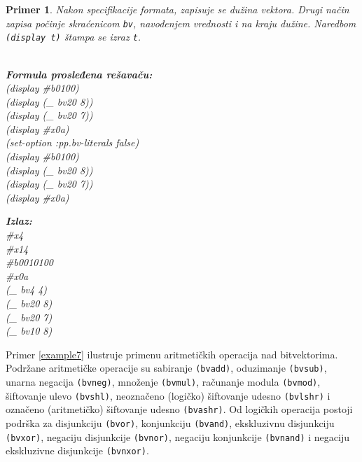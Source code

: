 \documentclass[12pt,oneside]{memoir}
\newtheorem{primer}{Primer}
\begin{document}
\begin{primer} \label{example6} 
Nakon specifikacije formata, zapisuje se dužina vektora. Drugi način zapisa počinje skraćenicom \texttt{bv}, navođenjem vrednosti i na kraju dužine. Naredbom \texttt{(display t)} štampa se izraz \texttt{t}.\\\\
\begin{minipage}[b]{0.45\textwidth}
\textbf{Formula prosleđena rešavaču:}
\\(display \#b0100)
\\(display (\_ bv20 8))
\\(display (\_ bv20 7))
\\(display \#x0a) 
\\(set-option :pp.bv-literals false)
\\(display \#b0100)
\\(display (\_ bv20 8))
\\(display (\_ bv20 7))
\\(display \#x0a)
\end{minipage}
\hspace{2.5cm}
\begin{minipage}[t]{0.4\textwidth}
\vspace{-5.93cm}
\textbf{Izlaz:}
\\\#x4 
\\\#x14 
\\\#b0010100 
\\\#x0a 
\\(\_ bv4 4) 
\\(\_ bv20 8) 
\\(\_ bv20 7) 
\\(\_ bv10 8)
\end{minipage}
\end{primer}
\par Primer \ref{example7} ilustruje primenu aritmetičkih operacija nad bitvektorima. Podržane aritmetičke operacije su sabiranje \texttt{(bvadd)}, oduzimanje \texttt{(bvsub)}, unarna negacija \texttt{(bvneg)}, množenje \texttt{(bvmul)}, računanje modula \texttt{(bvmod)}, šiftovanje ulevo \texttt{(bvshl)}, neoznačeno (logičko) šiftovanje udesno \texttt{(bvlshr)} i označeno (aritmetičko) šiftovanje udesno \texttt{(bvashr)}. Od logičkih operacija postoji podrška za disjunkciju \texttt{(bvor)}, konjunkciju \texttt{(bvand)}, ekskluzivnu disjunkciju \texttt{(bvxor)}, negaciju disjunkcije \texttt{(bvnor)}, negaciju konjunkcije \texttt{(bvnand)} i negaciju ekskluzivne disjunkcije \texttt{(bvnxor)}.
\end{document}
